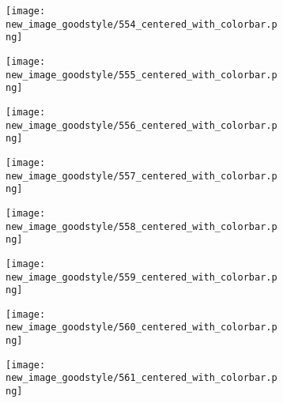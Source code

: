 \documentclass[a4paper,12pt]{article}
\begin{document}
\begin{figure}[H]
  \begin{subfigure}{0.11\textwidth}
    \texttt{[image: new\_image\_goodstyle/554\_centered\_with\_colorbar.png]}
  \end{subfigure}
  \hfill
  \begin{subfigure}{0.11\textwidth}
    \texttt{[image: new\_image\_goodstyle/555\_centered\_with\_colorbar.png]}
  \end{subfigure}
  \hfill
  \begin{subfigure}{0.11\textwidth}
    \texttt{[image: new\_image\_goodstyle/556\_centered\_with\_colorbar.png]}
  \end{subfigure}
  \hfill
  \begin{subfigure}{0.11\textwidth}
    \texttt{[image: new\_image\_goodstyle/557\_centered\_with\_colorbar.png]}
  \end{subfigure}
  \hfill
  \begin{subfigure}{0.11\textwidth}
    \texttt{[image: new\_image\_goodstyle/558\_centered\_with\_colorbar.png]}
  \end{subfigure}
  \hfill
  \begin{subfigure}{0.11\textwidth}
    \texttt{[image: new\_image\_goodstyle/559\_centered\_with\_colorbar.png]}
  \end{subfigure}
  \hfill
  \begin{subfigure}{0.11\textwidth}
    \texttt{[image: new\_image\_goodstyle/560\_centered\_with\_colorbar.png]}
  \end{subfigure}
  \hfill
  \begin{subfigure}{0.11\textwidth}
    \texttt{[image: new\_image\_goodstyle/561\_centered\_with\_colorbar.png]}
  \end{subfigure}
  \hfill
\end{figure}
\end{document}
